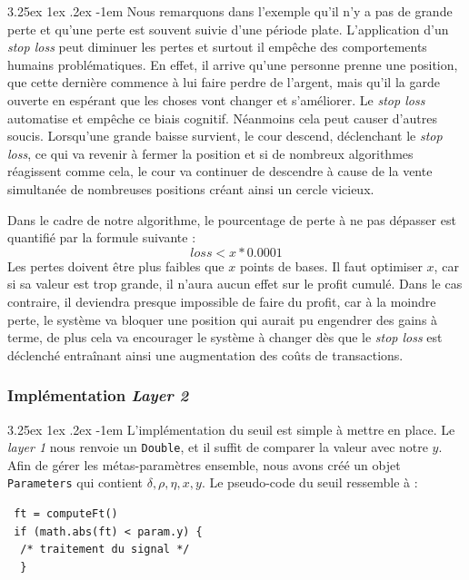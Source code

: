 \documentclass[a4paper, 11pt]{article}
\makeatletter
\renewcommand\paragraph{\@startsection{paragraph}{5}{\z@}%
  {3.25ex \@plus1ex \@minus.2ex}%
  {-1em}%
  {\normalfont\normalsize\bfseries}}
\makeatother
\begin{document}
\paragraph{}
Nous remarquons dans l'exemple qu'il n'y a pas de grande perte et qu'une perte est souvent suivie d'une période plate. L'application d'un \textit{stop loss}
peut diminuer les pertes et surtout il empêche des comportements humains problématiques. En effet, il arrive qu'une personne prenne une position, que
cette dernière commence à lui faire perdre de l'argent, mais qu'il la garde ouverte en espérant que les choses vont changer et s'améliorer. Le \textit{stop loss}
automatise et empêche ce biais cognitif. Néanmoins cela peut causer d'autres soucis. Lorsqu'une grande baisse survient, le cour descend,
déclenchant le \textit{stop loss}, ce qui va revenir à fermer la position et si de nombreux algorithmes réagissent comme cela, le cour va 
continuer de descendre à cause de la vente simultanée de nombreuses positions créant ainsi un cercle vicieux.

Dans le cadre de notre algorithme, le pourcentage de perte à ne pas dépasser est quantifié par la formule suivante :
$$loss < x * 0.0001$$
Les pertes doivent être plus faibles que $x$ points de bases. Il faut optimiser $x$, car si sa valeur est trop grande, il n'aura aucun effet sur le profit
cumulé. Dans le cas contraire, il deviendra presque impossible de faire du profit, car à la moindre perte, le système va bloquer une position qui aurait pu
engendrer des gains à terme, de plus cela va encourager le système à changer dès que le \textit{stop loss} est déclenché entraînant ainsi une augmentation des
coûts de transactions.

\subsubsection{Implémentation \textit{Layer 2}}
\paragraph{}
L'implémentation du seuil est simple à mettre en place. Le \textit{layer 1} nous renvoie un \texttt{Double}, et il suffit de comparer la valeur avec notre
$y$. Afin de gérer les métas-paramètres ensemble, nous avons créé un objet \texttt{Parameters} qui contient $\delta,\rho,\eta,x,y$. Le pseudo-code
du seuil ressemble à :

\begin{lstlisting}
 ft = computeFt()
 if (math.abs(ft) < param.y) {
  /* traitement du signal */
  }
\end{lstlisting}
\end{document}

